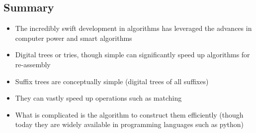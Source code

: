 
\begin{slide}
\section{Summary}

\begin{PauseHighLight}
  \begin{itemize}
  \item The incredibly swift development in algorithms has leveraged the
    advances in computer power and smart algorithms\pause
  \item Digital trees or tries, though simple can significantly speed up
    algorithms for re-assembly\pause
  \item Suffix trees are conceptually simple (digital trees of all
    suffixes)\pause
  \item They can vastly speed up operations such as matching\pause
  \item What is complicated is the algorithm to construct them
    efficiently\pause{} (though today they are widely available in programming
    languages such as python)\pause
  \end{itemize}
\end{PauseHighLight}

\end{slide}

